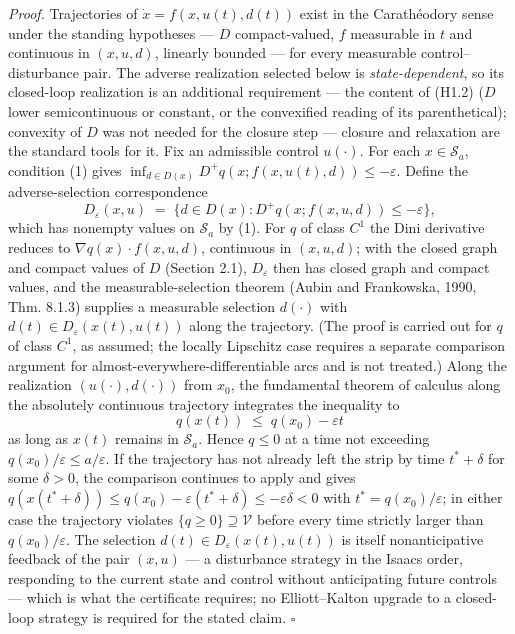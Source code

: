 \documentclass[11pt]{article}
\theoremstyle{definition}
\begin{document}
\emph{Proof.} Trajectories of \(\dot x = f(x, u(t), d(t))\) exist in the
Carath\'eodory sense under the standing hypotheses --- \(D\)
compact-valued, \(f\) measurable in \(t\) and continuous in \((x,u,d)\),
linearly bounded --- for every measurable control--disturbance pair. The
adverse realization selected below is \emph{state-dependent}, so its
closed-loop realization is an additional requirement --- the content of (H1.2) (\(D\) lower semicontinuous or constant, or
the convexified reading of its parenthetical); convexity of \(D\) was
not needed for the closure step --- closure and relaxation are the
standard tools for it. Fix an admissible control \(u(\cdot)\). For each
\(x \in \mathcal{S}_a\), condition (1) gives
\(\inf_{d \in D(x)} D^+ q(x; f(x,u(t),d)) \le -\varepsilon\). Define the
adverse-selection correspondence
\[D_{\varepsilon}(x, u) \;=\; \big\{ d \in D(x) : D^+ q(x; f(x,u,d)) \le -\varepsilon \big\},\]
which has nonempty values on \(\mathcal{S}_a\) by (1). For \(q\) of
class \(C^1\) the Dini derivative reduces to
\(\nabla q(x) \cdot f(x,u,d)\), continuous in \((x,u,d)\); with the
closed graph and compact values of \(D\) (Section 2.1),
\(D_{\varepsilon}\) then has closed graph and compact values, and the
measurable-selection theorem (Aubin and Frankowska, 1990, Thm. 8.1.3)
supplies a measurable selection \(d(\cdot)\) with
\(d(t) \in D_{\varepsilon}(x(t), u(t))\) along the trajectory. (The proof is carried out for \(q\) of class \(C^1\), as assumed; the locally Lipschitz case requires a separate comparison argument for almost-everywhere-differentiable arcs and is not treated.) Along the realization
\((u(\cdot), d(\cdot))\) from \(x_0\), the fundamental theorem of
calculus along the absolutely continuous trajectory integrates the
inequality to \[q(x(t)) \;\le\; q(x_0) - \varepsilon t\] as long as
\(x(t)\) remains in \(\mathcal{S}_a\). Hence \(q \le 0\) at a time not
exceeding \(q(x_0)/\varepsilon \le a/\varepsilon\). If the trajectory
has not already left the strip by time \(t^* + \delta\) for some
\(\delta > 0\), the comparison continues to apply and gives
\(q(x(t^* + \delta)) \le q(x_0) - \varepsilon(t^* + \delta) \le -\varepsilon\delta < 0\)
with \(t^* = q(x_0)/\varepsilon\); in either case the trajectory
violates \(\{ q \ge 0 \} \supseteq \mathcal{V}\) before every time
strictly larger than \(q(x_0)/\varepsilon\). The selection
\(d(t) \in D_\varepsilon(x(t), u(t))\) is itself nonanticipative
feedback of the pair \((x, u)\) --- a disturbance strategy in the Isaacs
order, responding to the current state and control without anticipating
future controls --- which is what the certificate requires; no
Elliott--Kalton upgrade to a closed-loop strategy is required for the
stated claim. \ensuremath{\square}
\end{document}
